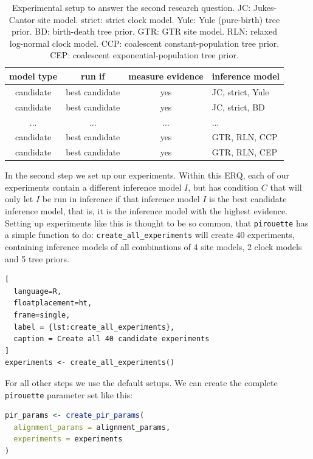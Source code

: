 \documentclass{article}
\begin{document}
\begin{table}
  \begin{tabular}{ | c | c | c | l | }
    \hline
    \textbf{model type} & \textbf{run if} & \textbf{measure evidence} & \textbf{inference model} \\ 
    \hline
    candidate & best candidate & yes & JC, strict, Yule \\
    candidate & best candidate & yes & JC, strict, BD   \\
    ...       & ...            & ... & ...              \\
    candidate & best candidate & yes & GTR, RLN, CCP    \\
    candidate & best candidate & yes & GTR, RLN, CEP    \\
    \hline
  \end{tabular}
  \caption{
    Experimental setup to answer the second research question.
    JC: Jukes-Cantor site model.
    strict: strict clock model.
    Yule: Yule (pure-birth) tree prior.
    BD: birth-death tree prior.
    GTR: GTR site model.
    RLN: relaxed log-normal clock model.
    CCP: coalescent constant-population tree prior.
    CEP: coalescent exponential-population tree prior.
  }
\end{table}

In the second step we set up our experiments. 
Within this ERQ, each of our experiments contain a different
inference model $I$, but has condition $C$ that will only let $I$
be run in inference if that inference model $I$ is the 
best candidate inference model, that is, 
it is the inference model with the highest evidence.
Setting up experiments like this is thought to be so common,
that \verb;pirouette; has a simple function to do:
\verb;create_all_experiments; will create 40 experiments,
containing inference models of all combinations of 4 site 
models, 2 clock models and 5 tree priors.

\begin{lstlisting}[
  language=R, 
  floatplacement=ht, 
  frame=single, 
  label = {lst:create_all_experiments},
  caption = Create all 40 candidate experiments
]
experiments <- create_all_experiments()
\end{lstlisting}

For all other steps we use the default setups. 
We can create the complete
\verb;pirouette; parameter set like this:

\begin{lstlisting}[language=R, floatplacement=ht, frame=single]
pir_params <- create_pir_params(
  alignment_params = alignment_params,
  experiments = experiments
)
\end{lstlisting}
\end{document}
